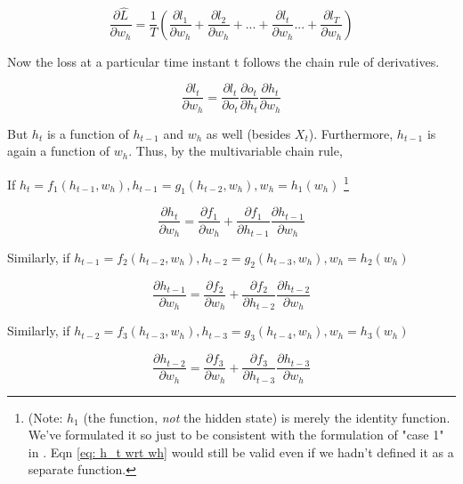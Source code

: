 \documentclass[12pt, letterpaper]{article}
\begin{document}
\begin{equation}
    \frac{\partial \hat{L}}{\partial w_h} = \frac{1}{T} (\frac{\partial l_1}{\partial w_h} + \frac{\partial l_2}{\partial w_h} + ... + \frac{\partial l_t}{\partial w_h} ... + \frac{\partial l_T}{\partial w_h})
\end{equation}

Now the loss at a particular time instant t follows the chain rule of derivatives.

\begin{equation}
    \frac{\partial l_t}{\partial w_h} = \frac{\partial l_t}{\partial o_t}\frac{\partial o_t}{\partial h_t}\frac{\partial h_t}{\partial w_h}
    \label{eq: l_t}
\end{equation}

But $h_t$ is a function of $h_{t-1}$ and $w_h$ as well (besides $X_t$).
Furthermore, $h_{t-1}$ is again a function of $w_h$.
Thus, by the multivariable chain rule,

If $h_t = f_1(h_{t-1}, w_h), h_{t-1}= g_1(h_{t-2}, w_h), w_h = h_1(w_h)$ \footnote{(Note: $h_1$ (the function, \textit{not} the hidden state) is merely the identity
function. We've formulated it so just to be consistent with the
formulation of "case 1" in \cite{multivariate_chain_rule}. Eqn \ref{eq: h_t wrt wh} would still 
be valid even if we hadn't defined it as a separate function.}

\begin{equation}
    \frac{\partial h_t}{\partial w_h} = \frac{\partial f_1}{\partial w_h} + \frac{\partial f_1}{\partial h_{t-1}}\frac{\partial h_{t-1}}{\partial w_h}
    \label{eq: h_t wrt wh}
\end{equation}

Similarly, if $h_{t-1} = f_2(h_{t-2}, w_h), h_{t-2}= g_2(h_{t-3}, w_h), w_h = h_2(w_h)$

\begin{equation}
    \frac{\partial h_{t-1}}{\partial w_h} = \frac{\partial f_2}{\partial w_h} + \frac{\partial f_2}{\partial h_{t-2}}\frac{\partial h_{t-2}}{\partial w_h}
\end{equation}

Similarly, if $h_{t-2} = f_3(h_{t-3}, w_h), h_{t-3}= g_3(h_{t-4}, w_h), w_h = h_3(w_h)$

\begin{equation}
    \frac{\partial h_{t-2}}{\partial w_h} = \frac{\partial f_3}{\partial w_h} + \frac{\partial f_3}{\partial h_{t-3}}\frac{\partial h_{t-3}}{\partial w_h}
    \label{eq: h_t-2 wrt wh}
\end{equation}
\end{document}
